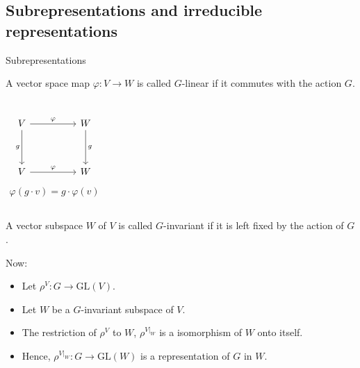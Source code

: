 \documentclass[handout, 10pt]{beamer}
\newcommand{\GL}{\text{GL}}
\begin{document}
	\subsection{Subrepresentations and irreducible representations}
	\begin{frame}[allowframebreaks]{Subrepresentations}
		\begin{definition}
			A vector space map $\varphi : V \rightarrow W$ is called $G$-linear if it commutes with the action $G$.
			\begin{columns}
				\[\begin{tikzcd}[ampersand replacement=\&]
					V \&\& W \\
					\\
					V \&\& W
					\arrow["\varphi", from=1-1, to=1-3]
					\arrow["g"', from=1-1, to=3-1]
					\arrow["g", from=1-3, to=3-3]
					\arrow["\varphi", from=3-1, to=3-3]
				\end{tikzcd}\]
				\begin{align*}
					\varphi(g \cdot v) = g \cdot \varphi(v)
				\end{align*}
			\end{columns}
		\end{definition}
			
		\begin{definition}
			A vector subspace $W$ of $V$ is called $G$-invariant if it is left fixed by the action of $G$.
		\end{definition}

		\begin{block}{Now:}
			\begin{itemize}
				\item Let $\rho^V : G \rightarrow \GL(V)$.
				
				\item Let $W$ be a $G$-invariant subspace of $V$.
				
				\item The restriction of $\rho^V$ to $W$, $\rho^{V|_W}$ is a isomorphism of $W$ onto itself.
				
				\item Hence, $\rho^{V|_W}: G \rightarrow \GL(W)$ is a representation of $G$ in $W$.
			\end{itemize}
		\end{block}
		

\end{frame}
\end{document}
